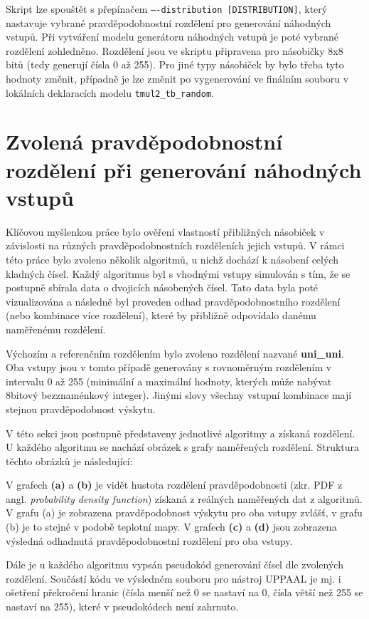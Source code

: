 Skript lze spouštět s přepínačem \texttt{----distribution [DISTRIBUTION]}, který nastavuje vybrané pravděpodobnostní rozdělení pro generování náhodných vstupů. Při vytváření modelu generátoru náhodných vstupů je poté vybrané rozdělení zohledněno. Rozdělení jsou ve skriptu připravena pro násobičky 8x8 bitů (tedy generují čísla 0 až 255). Pro jiné typy násobiček by bylo třeba tyto hodnoty změnit, případně je lze změnit po vygenerování ve finálním souboru v lokálních deklaracích modelu \texttt{tmul2\_tb\_random}.

\section{Zvolená pravděpodobnostní rozdělení při generování náhodných vstupů} \label{rozdeleni_pst}
Klíčovou myšlenkou práce bylo ověření vlastností přibližných násobiček v závislosti na různých pravděpodobnostních rozděleních jejich vstupů. V rámci této práce bylo zvoleno několik algoritmů, u nichž dochází k násobení celých kladných čísel. Každý algoritmus byl s vhodnými vstupy simulován s tím, že se postupně sbírala data o dvojicích násobených čísel. Tato data byla poté vizualizována a následně byl proveden odhad pravděpodobnostního rozdělení (nebo kombinace více rozdělení), které by přibližně odpovídalo danému naměřenému rozdělení.

Výchozím a referenčním rozdělením bylo zvoleno rozdělení nazvané \textbf{uni\_uni}. Oba vstupy jsou v tomto případě generovány s rovnoměrným rozdělením v intervalu 0 až 255 (minimální a maximální hodnoty, kterých může nabývat 8bitový bezznaménkový integer). Jinými slovy všechny vstupní kombinace mají stejnou pravděpodobnost výskytu.

V této sekci jsou postupně představeny jednotlivé algoritmy a získaná rozdělení. U každého algoritmu se nachází obrázek s grafy naměřených rozdělení. Struktura těchto obrázků je následující:

V grafech \textbf{(a)} a \textbf{(b)} je vidět hustota rozdělení pravděpodobnosti (zkr. PDF z angl. \textit{probability density function}) získaná z reálných naměřených dat z algoritmů. V grafu (a) je zobrazena pravděpodobnost výskytu pro oba vstupy zvlášť, v grafu (b) je to stejné v podobě teplotní mapy. V grafech \textbf{(c)} a \textbf{(d)} jsou zobrazena výsledná odhadnutá pravděpodobnostní rozdělení pro oba vstupy.

Dále je u každého algoritmu vypsán pseudokód generování čísel dle zvolených rozdělení. Součástí kódu ve výsledném souboru pro nástroj UPPAAL je mj. i ošetření překročení hranic (čísla menší než 0 se nastaví na 0, čísla větší než 255 se nastaví na 255), které v pseudokódech není zahrnuto.

